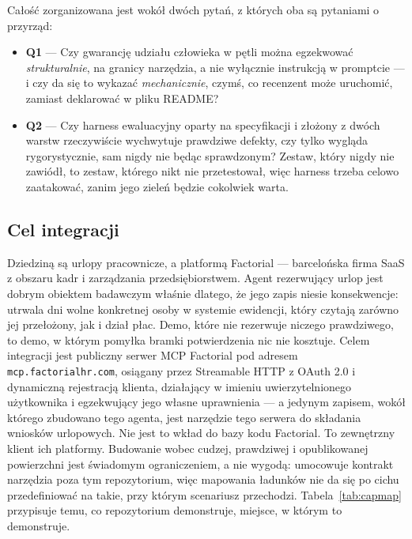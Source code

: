 \documentclass[11pt,a4paper]{article}
\begin{document}
Całość zorganizowana jest wokół dwóch pytań, z których oba są pytaniami o
przyrząd:

\begin{itemize}[leftmargin=*]
    \item \textbf{Q1} --- Czy gwarancję udziału człowieka w pętli można
    egzekwować \emph{strukturalnie}, na granicy narzędzia, a nie wyłącznie
    instrukcją w promptcie --- i czy da się to wykazać \emph{mechanicznie},
    czymś, co recenzent może uruchomić, zamiast deklarować w pliku README?
    \item \textbf{Q2} --- Czy harness ewaluacyjny oparty na specyfikacji i
    złożony z dwóch warstw rzeczywiście wychwytuje prawdziwe defekty, czy tylko
    wygląda rygorystycznie, sam nigdy nie będąc sprawdzonym? Zestaw, który nigdy
    nie zawiódł, to zestaw, którego nikt nie przetestował, więc harness trzeba
    celowo zaatakować, zanim jego zieleń będzie cokolwiek warta.
\end{itemize}

\subsection*{Cel integracji}

Dziedziną są urlopy pracownicze, a platformą Factorial --- barcelońska firma
SaaS z obszaru kadr i zarządzania przedsiębiorstwem. Agent rezerwujący urlop
jest dobrym obiektem badawczym właśnie dlatego, że jego zapis niesie
konsekwencje: utrwala dni wolne konkretnej osoby w systemie ewidencji, który
czytają zarówno jej przełożony, jak i dział płac. Demo, które nie rezerwuje
niczego prawdziwego, to demo, w którym pomyłka bramki potwierdzenia nic nie
kosztuje. Celem integracji jest publiczny serwer MCP Factorial pod adresem
\texttt{mcp.factorialhr.com}, osiągany przez Streamable HTTP z OAuth 2.0 i
dynamiczną rejestracją klienta, działający w imieniu uwierzytelnionego
użytkownika i egzekwujący jego własne uprawnienia --- a jedynym zapisem, wokół
którego zbudowano tego agenta, jest narzędzie tego serwera do składania
wniosków urlopowych. Nie jest to wkład do bazy kodu Factorial. To zewnętrzny
klient ich platformy. Budowanie wobec cudzej, prawdziwej i opublikowanej
powierzchni jest świadomym ograniczeniem, a nie wygodą: umocowuje kontrakt
narzędzia poza tym repozytorium, więc mapowania ładunków nie da się po cichu
przedefiniować na takie, przy którym scenariusz przechodzi.
Tabela~\ref{tab:capmap} przypisuje temu, co repozytorium demonstruje, miejsce,
w którym to demonstruje.
\end{document}
